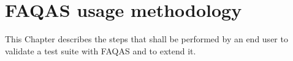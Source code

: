 
\chapter{FAQAS usage methodology}

This Chapter describes the steps that shall be performed by an end user to validate a test suite with FAQAS and to extend it.


